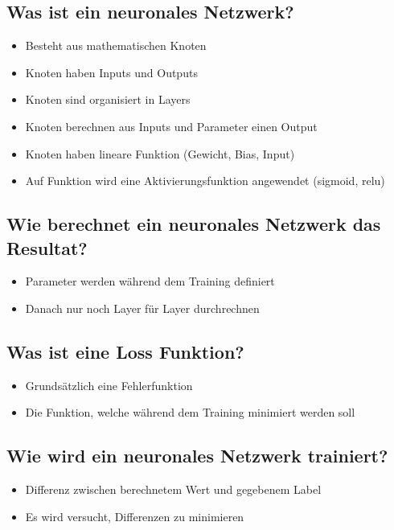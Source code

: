 \documentclass[a4paper]{article}
\begin{document}
		\subsection{Was ist ein neuronales Netzwerk?}
		
		\begin{itemize}
			\item Besteht aus mathematischen Knoten
			\item Knoten haben Inputs und Outputs
			\item Knoten sind organisiert in Layers
			\item Knoten berechnen aus Inputs und Parameter einen Output
			\item Knoten haben lineare Funktion (Gewicht, Bias, Input)
			\item Auf Funktion wird eine Aktivierungsfunktion angewendet (sigmoid, relu)
		\end{itemize}
	
		\subsection{Wie berechnet ein neuronales Netzwerk das Resultat?}
		
		\begin{itemize}
			\item Parameter werden während dem Training definiert
			\item Danach nur noch Layer für Layer durchrechnen
		\end{itemize}
	
		\subsection{Was ist eine Loss Funktion?}
		
		\begin{itemize}
			\item Grundsätzlich eine Fehlerfunktion
			\item Die Funktion, welche während dem Training minimiert werden soll
		\end{itemize}
		
		\subsection{Wie wird ein neuronales Netzwerk trainiert?}
		
		\begin{itemize}
			\item Differenz zwischen berechnetem Wert und gegebenem Label
			\item Es wird versucht, Differenzen zu minimieren
		\end{itemize}
	
\end{document}
